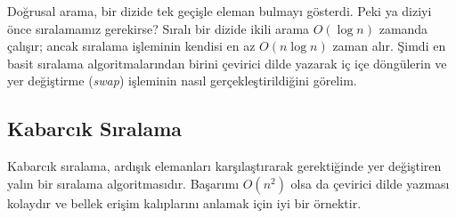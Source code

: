 Doğrusal arama, bir dizide tek geçişle eleman bulmayı gösterdi. Peki ya diziyi önce sıralamamız gerekirse? Sıralı bir dizide ikili arama $O(\log n)$ zamanda çalışır; ancak sıralama işleminin kendisi en az $O(n \log n)$ zaman alır. Şimdi en basit sıralama algoritmalarından birini çevirici dilde yazarak iç içe döngülerin ve yer değiştirme (\emph{swap}) işleminin nasıl gerçekleştirildiğini görelim.

\subsection{Kabarcık Sıralama}
\label{subsec:kabarcik-siralama}

Kabarcık sıralama, ardışık elemanları karşılaştırarak gerektiğinde yer değiştiren yalın bir sıralama algoritmasıdır. Başarımı $O(n^2)$ olsa da çevirici dilde yazması kolaydır ve bellek erişim kalıplarını anlamak için iyi bir örnektir.


